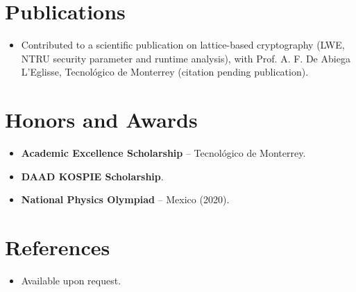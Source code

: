 \documentclass[11pt,a4paper,sans]{moderncv}
\begin{document}
\section{Publications}
\vspace{1pt}
\begin{itemize}
\item Contributed to a scientific publication on lattice-based cryptography (LWE, NTRU security parameter and runtime analysis), with Prof. A. F. De Abiega L'Eglisse, Tecnológico de Monterrey (citation pending publication).
\end{itemize}


\section{Honors and Awards}
\vspace{1pt}
\begin{itemize}
\item{\textbf{Academic Excellence Scholarship} -- Tecnológico de Monterrey.}
\item{\textbf{DAAD KOSPIE Scholarship}.}
\item{\textbf{National Physics Olympiad} -- Mexico (2020).}
\end{itemize}


\section{References}
\vspace{1pt}
\begin{itemize}
\item{Available upon request.}
\end{itemize}
\end{document}
